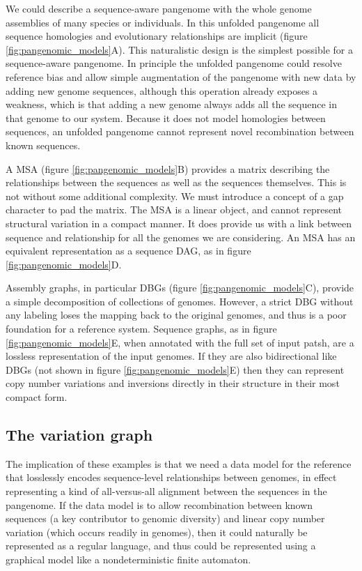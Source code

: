We could describe a sequence-aware pangenome with the whole genome assemblies of many species or individuals.
In this unfolded pangenome all sequence homologies and evolutionary relationships are implicit (figure \ref{fig:pangenomic_models}A).
This naturalistic design is the simplest possible for a sequence-aware pangenome.
In principle the unfolded pangenome could resolve reference bias and allow simple augmentation of the pangenome with new data by adding new genome sequences, although this operation already exposes a weakness, which is that adding a new genome always adds all the sequence in that genome to our system.
Because it does not model homologies between sequences, an unfolded pangenome cannot represent novel recombination between known sequences.

A MSA (figure \ref{fig:pangenomic_models}B) provides a matrix describing the relationships between the sequences as well as the sequences themselves.
This is not without some additional complexity.
We must introduce a concept of a gap character to pad the matrix.
The MSA is a linear object, and cannot represent structural variation in a compact manner.
It does provide us with a link between sequence and relationship for all the genomes we are considering.
An MSA has an equivalent representation as a sequence DAG, as in figure \ref{fig:pangenomic_models}D.

Assembly graphs, in particular DBGs (figure \ref{fig:pangenomic_models}C), provide a simple decomposition of collections of genomes.
However, a strict DBG without any labeling loses the mapping back to the original genomes, and thus is a poor foundation for a reference system.
Sequence graphs, as in figure \ref{fig:pangenomic_models}E, when annotated with the full set of input patsh, are a lossless representation of the input genomes.
If they are also bidirectional like DBGs (not shown in figure \ref{fig:pangenomic_models}E) then they can represent copy number variations and inversions directly in their structure in their most compact form.

\subsection{The variation graph}
\label{sec:the_variation_graph}

The implication of these examples is that we need a data model for the reference that losslessly encodes sequence-level relationships between genomes, in effect representing a kind of all-versus-all alignment between the sequences in the pangenome.
If the data model is to allow recombination between known sequences (a key contributor to genomic diversity) and linear copy number variation (which occurs readily in genomes), then it could naturally be represented as a regular language, and thus could be represented using a graphical model like a nondeterministic finite automaton.

